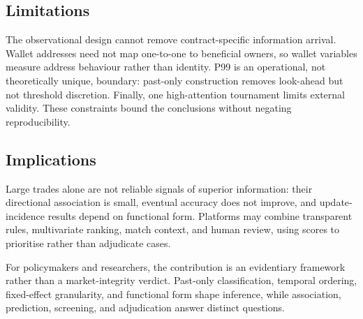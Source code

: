 \subsection{Limitations}
\label{sec:discussion-limits}

The observational design cannot remove contract-specific information arrival. Wallet addresses need not map one-to-one to beneficial owners, so wallet variables measure address behaviour rather than identity. P99 is an operational, not theoretically unique, boundary: past-only construction removes look-ahead but not threshold discretion. Finally, one high-attention tournament limits external validity. These constraints bound the conclusions without negating reproducibility.

\subsection{Implications}

Large trades alone are not reliable signals of superior information: their directional association is small, eventual accuracy does not improve, and update-incidence results depend on functional form. Platforms may combine transparent rules, multivariate ranking, match context, and human review, using scores to prioritise rather than adjudicate cases.

For policymakers and researchers, the contribution is an evidentiary framework rather than a market-integrity verdict. Past-only classification, temporal ordering, fixed-effect granularity, and functional form shape inference, while association, prediction, screening, and adjudication answer distinct questions.
